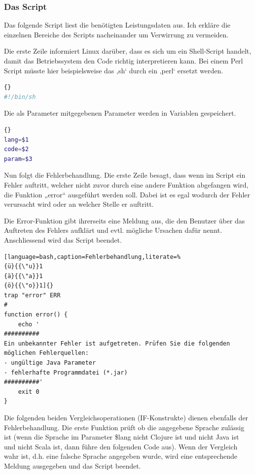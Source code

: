\documentclass{fancydocument}
\begin{document}
\subsubsection{Das Script}
Das folgende Script liest die benötigten Leistungsdaten aus. Ich erkläre die einzelnen Bereiche des Scripts nacheinander um Verwirrung zu vermeiden.

Die erste Zeile informiert Linux darüber, dass es sich um ein Shell-Script handelt, damit das Betriebssystem den Code richtig interpretieren kann. Bei einem Perl Script müsste hier beispielsweise das ‚sh‘ durch ein ‚perl‘ ersetzt werden.

\noindent
\begin{minipage}{\textwidth}
\begin{lstlisting}[language=bash,caption=Shebang]{}
#!/bin/sh
\end{lstlisting}
\end{minipage}
Die als Parameter mitgegebenen Parameter werden in Variablen gespeichert.

\noindent
\begin{minipage}{\textwidth}
\begin{lstlisting}[language=bash,caption=Parameter]{}
lang=$1
code=$2
param=$3
\end{lstlisting}
\end{minipage}

Nun folgt die Fehlerbehandlung.  Die erste Zeile besagt, dass wenn im Script ein Fehler auftritt, welcher nicht zuvor durch eine andere Funktion abgefangen wird, die Funktion „error“ ausgeführt werden soll. Dabei ist es egal wodurch der Fehler verursacht wird oder an welcher Stelle er auftritt.

Die Error-Funktion gibt ihrerseits eine Meldung aus, die den Benutzer über das Auftreten des Fehlers aufklärt und evtl. mögliche Ursachen dafür nennt. Anschliessend wird das Script beendet.

\noindent
\begin{minipage}{\textwidth}
\begin{lstlisting}[language=bash,caption=Fehlerbehandlung,literate=% 
{ü}{{\"u}}1 
{ä}{{\"a}}1 
{ö}{{\"o}}1]{}
trap "error" ERR
#
function error() {
	echo '
##########
Ein unbekannter Fehler ist aufgetreten. Prüfen Sie die folgenden möglichen Fehlerquellen:
- ungültige Java Parameter
- fehlerhafte Programmdatei (*.jar)
##########'
	exit 0
}
\end{lstlisting}
\end{minipage}

Die folgenden beiden Vergleichsoperationen (IF-Konstrukte) dienen ebenfalls der Fehlerbehandlung. Die erste Funktion prüft ob die angegebene Sprache zulässig ist (wenn die Sprache im Parameter \$lang nicht Clojure ist und nicht Java ist und nicht Scala ist, dann führe den folgenden Code aus). Wenn der Vergleich wahr ist, d.h. eine falsche Sprache angegeben wurde, wird eine entsprechende Meldung ausgegeben und das Script beendet.
\end{document}
